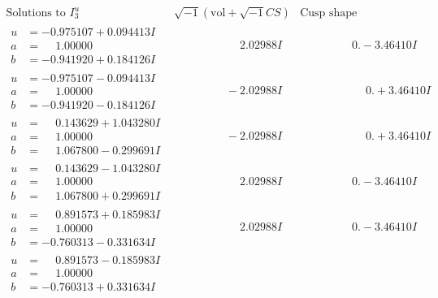 \documentclass[1p]{elsarticle_modified}
\theoremstyle{definition}
\newcommand{\I}{\sqrt{-1}}
\begin{document}
$$\begin{array}{c|c|c}  
\text{Solutions to }I^u_{3}& \I (\text{vol} + \sqrt{-1}CS) & \text{Cusp shape}\\
 \hline 
\begin{aligned}
u &= -0.975107 + 0.094413 I \\
a &= \phantom{-}1.00000\phantom{ +0.000000I} \\
b &= -0.941920 + 0.184126 I\end{aligned}
 & \phantom{-0.000000 -}2.02988 I & \phantom{-0.000000 } 0. - 3.46410 I \\ \hline\begin{aligned}
u &= -0.975107 - 0.094413 I \\
a &= \phantom{-}1.00000\phantom{ +0.000000I} \\
b &= -0.941920 - 0.184126 I\end{aligned}
 & \phantom{-0.000000 } -2.02988 I & \phantom{-0.000000 -}0. + 3.46410 I \\ \hline\begin{aligned}
u &= \phantom{-}0.143629 + 1.043280 I \\
a &= \phantom{-}1.00000\phantom{ +0.000000I} \\
b &= \phantom{-}1.067800 - 0.299691 I\end{aligned}
 & \phantom{-0.000000 } -2.02988 I & \phantom{-0.000000 -}0. + 3.46410 I \\ \hline\begin{aligned}
u &= \phantom{-}0.143629 - 1.043280 I \\
a &= \phantom{-}1.00000\phantom{ +0.000000I} \\
b &= \phantom{-}1.067800 + 0.299691 I\end{aligned}
 & \phantom{-0.000000 -}2.02988 I & \phantom{-0.000000 } 0. - 3.46410 I \\ \hline\begin{aligned}
u &= \phantom{-}0.891573 + 0.185983 I \\
a &= \phantom{-}1.00000\phantom{ +0.000000I} \\
b &= -0.760313 - 0.331634 I\end{aligned}
 & \phantom{-0.000000 -}2.02988 I & \phantom{-0.000000 } 0. - 3.46410 I \\ \hline\begin{aligned}
u &= \phantom{-}0.891573 - 0.185983 I \\
a &= \phantom{-}1.00000\phantom{ +0.000000I} \\
b &= -0.760313 + 0.331634 I\end{aligned}

\end{array}$$
\end{document}
